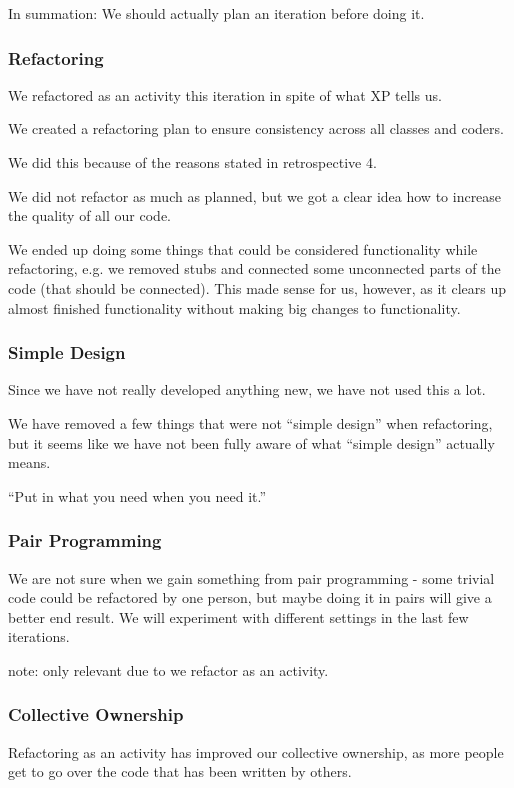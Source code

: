 In summation: We should actually plan an iteration before doing it.


\subsubsection{Refactoring}
We refactored as an activity this iteration in spite of what XP tells us.

We created a refactoring plan to ensure consistency across all classes and coders.

We did this because of the reasons stated in retrospective 4.

We did not refactor as much as planned, but we got a clear idea how to increase the quality of all our code.

We ended up doing some things that could be considered functionality while refactoring, e.g. we removed stubs and connected some unconnected parts of the code (that should be connected). This made sense for us, however, as it clears up almost finished functionality without making big changes to functionality.

\subsubsection{Simple Design}
Since we have not really developed anything new, we have not used this a lot.

We have removed a few things that were not “simple design” when refactoring, but it seems like we have not been fully aware of what “simple design” actually means.

“Put in what you need when you need it.”

\subsubsection{Pair Programming}
We are not sure when we gain something from pair programming - some trivial code could be refactored by one person, but maybe doing it in pairs will give a better end result. We will experiment with different settings in the last few iterations.

note: only relevant due to we refactor as an activity.

\subsubsection{Collective Ownership}
Refactoring as an activity has improved our collective ownership, as more people get to go over the code that has been written by others.

